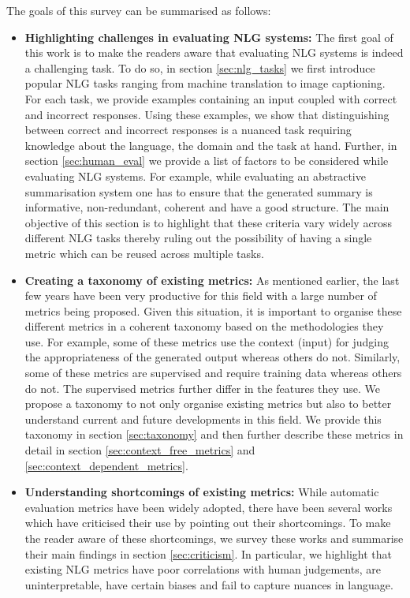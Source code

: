The goals of this survey can be summarised as follows:
\begin{itemize}
    \item \textbf{Highlighting challenges in evaluating NLG systems:} The first goal of this work is to make the readers aware that evaluating NLG systems is indeed a challenging task. To do so, in section \ref{sec:nlg_tasks} we first introduce popular NLG tasks ranging from machine translation to image captioning. For each task, we provide examples containing an input coupled with correct and incorrect responses. Using these examples, we show that distinguishing between correct and incorrect responses is a nuanced task requiring knowledge about the language, the domain and the task at hand. Further, in section \ref{sec:human_eval} we provide a list of factors to be considered while evaluating NLG systems. For example, while evaluating an abstractive summarisation system one has to ensure that the generated summary is informative, non-redundant, coherent and have a good structure. The main objective of this section is to highlight that these criteria vary widely across different NLG tasks thereby ruling out the possibility of having a single metric which can be reused across multiple tasks.
    \item \textbf{Creating a taxonomy of existing metrics:} As mentioned earlier, the last few years have been very productive for this field with a large number of metrics being proposed. Given this situation, it is important to organise these different metrics in a coherent taxonomy based on the methodologies they use. For example, some of these metrics use the context (input) for judging the appropriateness of the generated output whereas others do not. Similarly, some of these metrics are supervised and require training data whereas others do not. The supervised metrics further differ in the features they use. We propose a taxonomy to not only organise existing metrics but also to better understand current and future developments in this field. We provide this taxonomy in section \ref{sec:taxonomy} and then further describe these metrics in detail in section \ref{sec:context_free_metrics} and \ref{sec:context_dependent_metrics}.
    \item \textbf{Understanding shortcomings of existing metrics:} While automatic evaluation metrics have been widely adopted, there have been several works which have criticised their use by pointing out their shortcomings. To make the reader aware of these shortcomings, we survey these works and summarise their main findings in section \ref{sec:criticism}. In particular, we highlight that existing NLG metrics have poor correlations with human judgements, are uninterpretable, have certain biases and fail to capture nuances in language.

\end{itemize}
